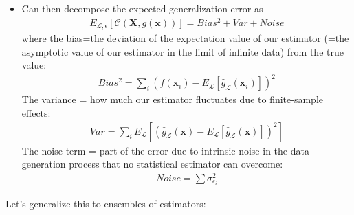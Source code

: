 \documentclass[norsk,a4paper,11pt]{article}
\begin{document}
\begin{itemize}
\begin{itemize}
		\item Can then decompose the expected generalization error as
		\begin{align}
			E_{\mathcal{L}, \epsilon} [\mathcal{C} (\bm{X}, g(\bm{x}))] = Bias^2 + Var + Noise
		\end{align}
		where the bias=the deviation of the expectation value of our estimator (=the asymptotic value of our estimator in the limit of infinite data) from the true value:
		\begin{align}
			Bias^2 = \sum_i (f(\bm{x}_i) - E_\mathcal{L} [\hat{g}_\mathcal{L} (\bm{x}_i)])^2
		\end{align}
		The variance = how much our estimator fluctuates due to finite-sample effects:
		\begin{align}
			Var = \sum_i E_\mathcal{L} [(\hat{g}_{\mathcal{L}} (\bm{x}) - E_\mathcal{L} [\hat{g}_{\mathcal{L}} (\bm{x})] )^2]
		\end{align}
		The noise term = part of the error due to intrinsic noise in the data generation process that no statistical estimator can overcome:
		\begin{align}
			Noise = \sum{\sigma_{\epsilon_i}^2}
		\end{align}
	\end{itemize}
\end{itemize}
Let's generalize this to ensembles of estimators:
\end{document}
